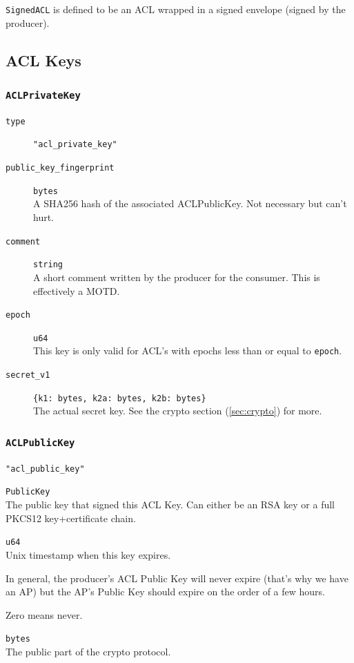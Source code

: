 \documentclass[pdftex,12pt,a4papaer,twoside,notitlepage]{report}
\begin{document}
\texttt{SignedACL} is defined to be an ACL wrapped in a signed envelope (signed
by the producer).

\subsection{ACL Keys}

\subsubsection{\texttt{ACLPrivateKey}}

\begin{leftbar}
\begin{description}
\item[\texttt{type}] \verb="acl_private_key"=
\item[\texttt{public\_key\_fingerprint}] \texttt{bytes} \\
  A SHA256 hash of the associated ACLPublicKey. Not necessary but can't hurt.

\item[\texttt{comment}] \texttt{string} \\
  A short comment written by the producer for the consumer. This is effectively a MOTD.
\item[\texttt{epoch}] \texttt{u64} \\
  This key is only valid for ACL's with epochs less than or equal to \texttt{epoch}.
\item[\texttt{secret\_v1}] \verb={k1: bytes, k2a: bytes, k2b: bytes}= \\
  The actual secret key. See the crypto section (\ref{sec:crypto}) for more.
\end{description}
\end{leftbar}

\subsubsection{\texttt{ACLPublicKey}}

\begin{leftbar}
\begin{description}[labelindent=2em,leftmargin=3em]
\item[\texttt{type}] \verb="acl_public_key"=
\item[\texttt{signing\_key}] \texttt{PublicKey} \\
  The public key that signed this ACL Key. Can either be an RSA key or a
  full PKCS12 key+certificate chain.

\item[\texttt{expires}] \texttt{u64} \\
  Unix timestamp when this key expires.

  In general, the producer's ACL Public Key will never expire (that's why we
  have an AP) but the AP's Public Key should expire on the order of a few
  hours.
  
  Zero means never.

\item[\texttt{public\_v1}] \texttt{bytes} \\
  The public part of the crypto protocol.
\end{description}
\end{leftbar}
\end{document}
